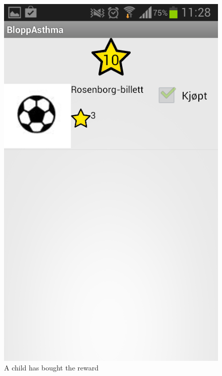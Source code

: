 \begin{figure}
\begin{minipage}[t]{0.3\linewidth}
			\includegraphics[width=0.20\paperwidth]{Pictures/new-screenshots/child-bought-reward.png}
		\caption{A child has bought the reward}
		\label{fig:child-bought-rewards}
	\end{minipage}
\end{figure}

